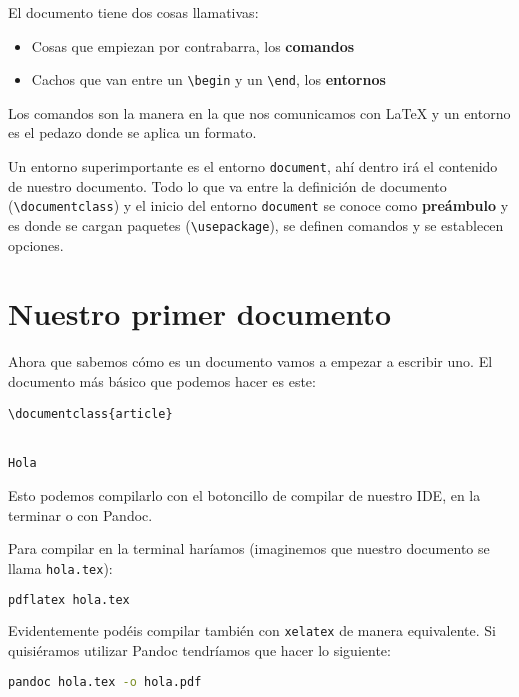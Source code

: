 El documento tiene dos cosas llamativas:

\begin{itemize}
\item
  Cosas que empiezan por contrabarra, los \textbf{comandos}
\item
  Cachos que van entre un \lstinline!\begin! y un \lstinline!\end!, los
  \textbf{entornos}
\end{itemize}

Los comandos son la manera en la que nos comunicamos con LaTeX y un
entorno es el pedazo donde se aplica un formato.

Un entorno superimportante es el entorno \lstinline!document!, ahí
dentro irá el contenido de nuestro documento. Todo lo que va entre la
definición de documento (\lstinline!\documentclass!) y el inicio del
entorno \lstinline!document! se conoce como \textbf{preámbulo} y es
donde se cargan paquetes (\lstinline!\usepackage!), se definen comandos
y se establecen opciones.

\section{Nuestro primer documento}\label{nuestro-primer-documento}

Ahora que sabemos cómo es un documento vamos a empezar a escribir uno.
El documento más básico que podemos hacer es este:

\begin{lstlisting}[language={[latex]tex}]
\documentclass{article}


Hola

\end{lstlisting}

Esto podemos compilarlo con el botoncillo de compilar de nuestro IDE, en
la terminar o con Pandoc.

Para compilar en la terminal haríamos (imaginemos que nuestro documento
se llama \lstinline!hola.tex!):

\begin{lstlisting}[language=bash]
pdflatex hola.tex
\end{lstlisting}

Evidentemente podéis compilar también con \lstinline!xelatex! de manera
equivalente. Si quisiéramos utilizar Pandoc tendríamos que hacer lo
siguiente:

\begin{lstlisting}[language=bash]
pandoc hola.tex -o hola.pdf
\end{lstlisting}

